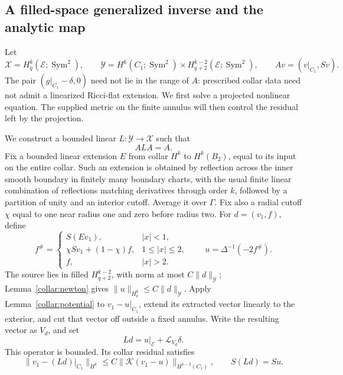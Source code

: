 \subsection{A filled-space generalized inverse and the analytic map}
\label{collar:analytic-map}

Let
\[
 \mathcal X=H^k_q(\mathcal E;\operatorname{Sym}^2),\qquad
 \mathcal Y=H^k(C_1;\operatorname{Sym}^2)
       \mathbin{\times}H^{k-2}_{q+2}(\mathcal E;\operatorname{Sym}^2),
 \qquad Av=(v|_{C_1},Sv).
\]
The pair \((g|_{C_1}-\delta,0)\) need not lie in the range of
\(A\): prescribed collar data need not admit a linearized Ricci-flat
extension.  We first solve a projected nonlinear equation.  The
supplied metric on the finite annulus will then control the residual
left by the projection.

We construct a bounded linear \(L:\mathcal Y\to\mathcal X\) such that
\begin{equation}
 ALA=A.
 \label{collar:generalized-inverse}
\end{equation}
Fix a bounded linear extension \(E\) from collar \(H^k\) to
\(H^k(B_2)\), equal to its input on the entire collar.  Such an
extension is obtained by reflection across the inner smooth
boundary in finitely many boundary charts, with the usual finite
linear combination of reflections matching derivatives through
order \(k\), followed by a partition of unity and an interior
cutoff.  Average it over \(\Gamma\).  Fix also a radial cutoff
\(\chi\) equal to one near radius one and zero before radius two.
For \(d=(v_1,f)\), define
\begin{equation}
 f^\#=
 \begin{cases}
 S(Ev_1),& |x|<1,\\
 \chi Sv_1+(1-\chi)f,&1\le |x|\le2,\\
 f,&|x|>2.
 \end{cases}
 \qquad u=\Delta^{-1}(-2f^\#).
 \label{collar:filled-source}
\end{equation}
The source lies in filled \(H^{k-2}_{q+2}\), with norm at most
\(C\|d\|_{\mathcal Y}\); Lemma~\ref{collar:newton} gives
\(\|u\|_{H^k_q}\le C\|d\|_{\mathcal Y}\).
Apply Lemma~\ref{collar:potential} to \(v_1-u|_{C_1}\), extend
its extracted vector linearly to the exterior, and cut that vector
off outside a fixed annulus.  Write the resulting vector as
\(V_d\), and set
\[
 Ld=u|_{\mathcal E}+\mathcal L_{V_d}\delta.
\]
This operator is bounded.  Its collar residual satisfies
\begin{equation}
 \|v_1-(Ld)|_{C_1}\|_{H^k}
       \le C\|\mathcal K(v_1-u)\|_{H^{k-2}(C_1)},
 \qquad S(Ld)=Su.
 \label{collar:L-residual}
\end{equation}

